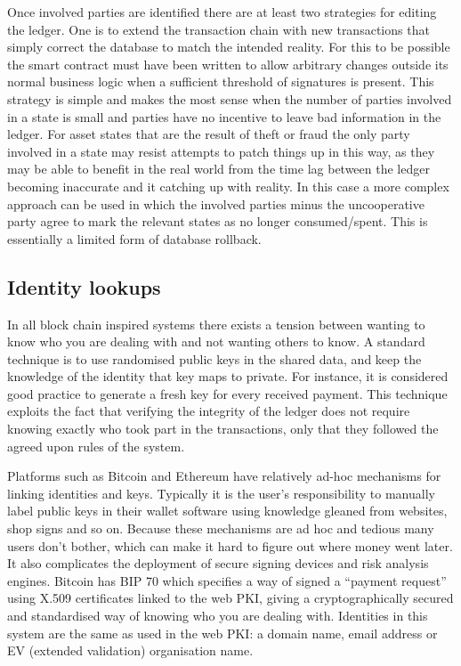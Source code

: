 \documentclass{article}
\begin{document}

Once involved parties are identified there are at least two strategies for editing the ledger. One is to extend
the transaction chain with new transactions that simply correct the database to match the intended reality. For
this to be possible the smart contract must have been written to allow arbitrary changes outside its normal
business logic when a sufficient threshold of signatures is present. This strategy is simple and makes the most
sense when the number of parties involved in a state is small and parties have no incentive to leave bad information
in the ledger. For asset states that are the result of theft or fraud the only party involved in a state may
resist attempts to patch things up in this way, as they may be able to benefit in the real world from the time
lag between the ledger becoming inaccurate and it catching up with reality. In this case a more complex approach
can be used in which the involved parties minus the uncooperative party agree to mark the relevant states as
no longer consumed/spent. This is essentially a limited form of database rollback.

\subsection{Identity lookups}

In all block chain inspired systems there exists a tension between wanting to know who you are dealing with and
not wanting others to know. A standard technique is to use randomised public keys in the shared data, and keep
the knowledge of the identity that key maps to private. For instance, it is considered good practice to generate
a fresh key for every received payment. This technique exploits the fact that verifying the integrity of the ledger
does not require knowing exactly who took part in the transactions, only that they followed the agreed upon
rules of the system.

Platforms such as Bitcoin and Ethereum have relatively ad-hoc mechanisms for linking identities and keys. Typically
it is the user's responsibility to manually label public keys in their wallet software using knowledge gleaned from
websites, shop signs and so on. Because these mechanisms are ad hoc and tedious many users don't bother, which
can make it hard to figure out where money went later. It also complicates the deployment of secure signing devices
and risk analysis engines. Bitcoin has BIP 70\cite{BIP70} which specifies a way of signed a ``payment
request'' using X.509 certificates linked to the web PKI, giving a cryptographically secured and standardised way
of knowing who you are dealing with. Identities in this system are the same as used in the web PKI: a domain name,
email address or EV (extended validation) organisation name.
\end{document}
